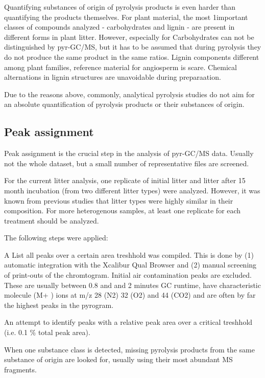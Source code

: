 Quantifying substances of origin of pyrolysis products is even harder than quantifying the products themselves. For plant material, the most 1important classes of compounds analyzed - carbohydrates and lignin - are present in different forms in plant litter. However, especially for Carbohydrates can not be distinguished by pyr-GC/MS, but it has to be assumed that during pyrolysis they do not produce the same product in the same ratios. Lignin components different among plant families, reference material for angiosperm is scare. Chemical alternations in lignin structures are unavoidable during preparaation.


Due to the reasons above, commonly, analytical pyrolysis studies do not aim for an absolute quantification of pyrolysis products or their substances of origin. 



\subsection{Peak assignment}

Peak assignment is the crucial step in the analysis of pyr-GC/MS data. Usually not the whole dataset, but a small number of representative files are screened. 

For the current litter analysis, one replicate of initial litter and litter after 15 month incubation (from two different litter types) were analyzed. However, it was known from previous studies that litter types were highly similar in their composition. For more heterogenous samples, at least one replicate for each treatment should be analyzed. 

The following steps were applied:

A List all peaks over a certain area treshhold was compiled. This is done by (1) automatic integration with the Xcalibur Qual Browser and (2) manual screening of print-outs of the chromtogram. Initial air contamination peaks are excluded. These are usually between 0.8 and and 2 minutes GC runtime, have characteristic molecule (M+ ) ions at m/z 28 (N2) 32 (O2) and 44 (CO2) and are often by far the highest peaks in the pyrogram. 

An attempt to identify peaks with a relative peak area over a critical treshhold (i.e. 0.1 \% total peak area).

When one substance class is detected, missing pyrolysis products from the same substance of origin are looked for, usually using their most abundant MS fragments.

